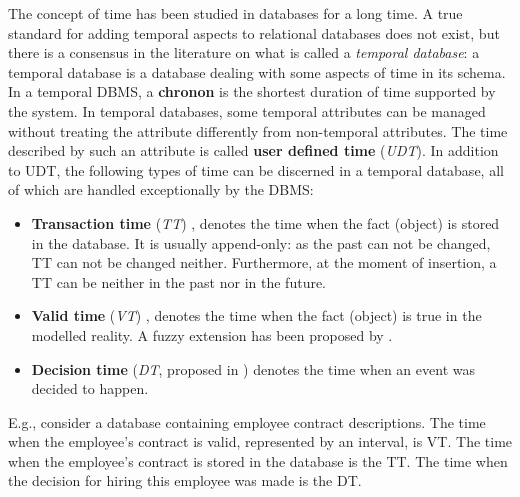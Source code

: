 %
%
The concept of time has been studied in databases for a long time. A true standard for adding temporal aspects to relational databases does not exist, but there is a consensus in the literature \cite{Dyreson1994} on what is called a \emph{temporal database}: a temporal database is a database dealing with some aspects of time in its schema.
In a temporal DBMS, a \textbf{chronon} is the shortest duration of time supported by the system. In temporal databases, some temporal attributes can be managed without treating the attribute differently from non-temporal attributes. The time described by such an attribute is called \textbf{user defined time} (\emph{UDT}). In addition to UDT, the following types of time can be discerned in a temporal database, all of which are handled exceptionally by the DBMS:

\begin{itemize}
	\item
	\textbf{Transaction time} (\emph{TT}) \cite{L.Rowe1987},\cite{Jensen1991a} denotes the time when the fact (object) is stored in the database. It is usually append-only: as the past can not be changed, TT can not be changed neither. Furthermore, at the moment of insertion, a TT can be neither in the past nor in the future.
	\item
	\textbf{Valid time} (\emph{VT}) \cite{Jensen1994},\cite{Sarda1990} denotes the time when the fact (object) is true in the modelled reality. A fuzzy extension has been proposed by \cite{Garrido2009}. 
	\item
	\textbf{Decision time} (\emph{DT}, proposed in \cite{Nascimento1995}) denotes the time when an event was decided to happen. 
	\end{itemize}
	
	E.g., consider a database containing employee contract descriptions. The time when the employee's contract is valid, represented by an interval, is VT. The time when the employee's contract is stored in the database is the TT. The time when the decision for hiring this employee was made is the DT.


